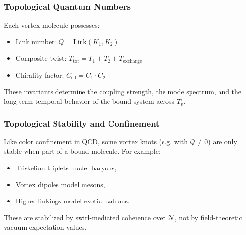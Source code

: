 \subsubsection*{Topological Quantum Numbers}

Each vortex molecule possesses:
\begin{itemize}
  \item Link number: \( Q = \text{Link}(K_1, K_2) \)
  \item Composite twist: \( T_{\text{tot}} = T_1 + T_2 + T_{\text{exchange}} \)
  \item Chirality factor: \( C_{\text{eff}} = C_1 \cdot C_2 \)
\end{itemize}

These invariants determine the coupling strength, the mode spectrum, and the long-term temporal behavior of the bound system across \( T_v \).

\subsubsection*{Topological Stability and Confinement}

Like color confinement in QCD, some vortex knots (e.g. with \( Q \neq 0 \)) are only stable when part of a bound molecule. For example:
\begin{itemize}
  \item Triskelion triplets model baryons,
  \item Vortex dipoles model mesons,
  \item Higher linkings model exotic hadrons.
\end{itemize}

These are stabilized by swirl-mediated coherence over \( \mathcal{N} \), not by field-theoretic vacuum expectation values.

